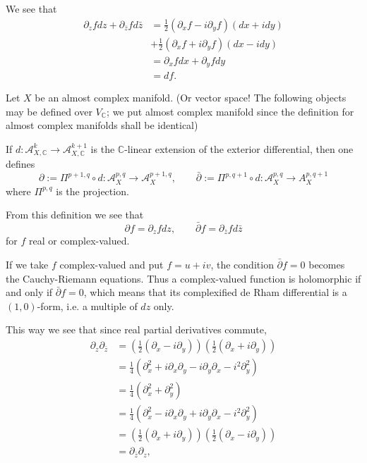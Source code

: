\documentclass{book}
\begin{document}
We see that
$$
\begin{aligned}
\partial_zfdz+\partial_{\bar{z}} fd\bar{z}
&=\frac{1}{2}(\partial_xf-i\partial_y
f)(dx+idy)\\
&+\frac{1}{2}(\partial_x f+i \partial_y
f)(dx- i dy)\\
&=\partial_x f dx + \partial_y f dy\\
&=df.
\end{aligned}
$$

\noindent
\begin{definition}
\label{definition-dbar}
\begin{reference}
\cite[Definition 1.3.5]{huc}
\end{reference}
Let $X$ be an almost complex manifold.
(Or vector space! The following
objects may be defined over $V_{\mathbb{C}}$;
we put almost complex manifold since the
definition
for almost complex manifolds shall be
identical)

If  $d:\mathcal{A}^k_{X,\mathbb{C}}\to
\mathcal{A}^{k+1}_{X,\mathbb{C}}$
is the $\mathbb{C}$-linear extension of the
exterior differential, then one defines
$$
\partial:=\Pi^{p+1,q} \circ d
:\mathcal{A}^{p,q}_X \to
\mathcal{A}^{p+1,q}_X,
\qquad
\bar{\partial}:=\Pi^{p,q+1} \circ d
:\mathcal{A}^{p,q}_X \to A^{p,q+1}_X
$$
where $\Pi^{p,q}$ is the projection.
\end{definition}

\noindent
From this definition we see that
$$
\partial f = \partial_z fdz,\qquad
\bar\partial f = \partial_{\bar{z}}fd\bar{z}
$$
for $f$ real or complex-valued.

If we take $f$ complex-valued
and put $f=u+iv$,
the condition $\bar\partial f =0$
becomes the Cauchy-Riemann equations.
Thus a complex-valued function is holomorphic
if and only if
$\bar\partial f=0$, which means that its
complexified de Rham differential is a
$(1,0)$-form,
i.e. a multiple of $dz$ only.

This way we see that since real partial
derivatives commute,
$$
\begin{aligned}
\partial_z \partial_{\bar{z}}
&=\left(\frac{1}{2}(\partial_x - i
\partial_y)\right)
\left(\frac{1}{2}(\partial_x+i
\partial_y)\right)\\
&=\frac{1}{4}(\partial_x^2
+i \partial_x\partial_y-i\partial_y\partial_x
-i^2 \partial_y^2)\\
&=\frac{1}{4}(\partial_x^2+\partial_y^2)\\
&=\frac{1}{4}(\partial_x^2
-i \partial_x\partial_y+i\partial_y\partial_x
-i^2 \partial_y^2)\\
&=\left(\frac{1}{2}(\partial_x + i
\partial_y)\right)
\left(\frac{1}{2}(\partial_x-i
\partial_y)\right)\\
&=\partial_{\bar{z}}\partial_z,
\end{aligned}
$$
\end{document}
